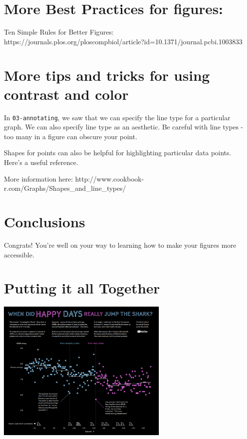\documentclass[
  letterpaper,
  DIV=11,
  numbers=noendperiod]{scrreprt}
\begin{document}
\section*{More Best Practices for
figures:}\label{more-best-practices-for-figures}


Ten Simple Rules for Better Figures:
https://journals.plos.org/ploscompbiol/article?id=10.1371/journal.pcbi.1003833

\section*{More tips and tricks for using contrast and
color}\label{more-tips-and-tricks-for-using-contrast-and-color}


In \texttt{03-annotating}, we saw that we can specify the line type for
a particular graph. We can also specify line type as an aesthetic. Be
careful with line types - too many in a figure can obscure your point.

Shapes for points can also be helpful for highlighting particular data
points. Here's a useful reference.

More information here:
http://www.cookbook-r.com/Graphs/Shapes\_and\_line\_types/

\section*{Conclusions}\label{conclusions}


Congrats! You're well on your way to learning how to make your figures
more accessible.

\section*{Putting it all Together}\label{putting-it-all-together}


\includegraphics[width=3.31in,height=\textheight]{image/David_H.png}
\end{document}

